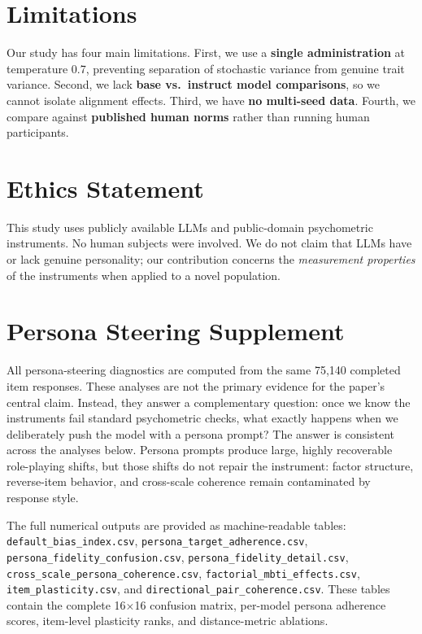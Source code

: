 \documentclass[11pt]{article}
\begin{document}
\section{Limitations}

Our study has four main limitations. First, we use a \textbf{single administration} at temperature 0.7, preventing separation of stochastic variance from genuine trait variance. Second, we lack \textbf{base vs.\ instruct model comparisons}, so we cannot isolate alignment effects. Third, we have \textbf{no multi-seed data}. Fourth, we compare against \textbf{published human norms} rather than running human participants.

\section*{Ethics Statement}

This study uses publicly available LLMs and public-domain psychometric instruments. No human subjects were involved. We do not claim that LLMs have or lack genuine personality; our contribution concerns the \emph{measurement properties} of the instruments when applied to a novel population.




\clearpage
\appendix

\section{Persona Steering Supplement}
\label{sec:appendix_persona_steering}

All persona-steering diagnostics are computed from the same 75{,}140 completed item responses. These analyses are not the primary evidence for the paper's central claim. Instead, they answer a complementary question: once we know the instruments fail standard psychometric checks, what exactly happens when we deliberately push the model with a persona prompt? The answer is consistent across the analyses below. Persona prompts produce large, highly recoverable role-playing shifts, but those shifts do not repair the instrument: factor structure, reverse-item behavior, and cross-scale coherence remain contaminated by response style.

The full numerical outputs are provided as machine-readable tables: \texttt{default\_bias\_index.csv}, \texttt{persona\_target\_adherence.csv}, \texttt{persona\_fidelity\_confusion.csv}, \texttt{persona\_fidelity\_detail.csv}, \texttt{cross\_scale\_persona\_coherence.csv}, \texttt{factorial\_mbti\_effects.csv}, \texttt{item\_plasticity.csv}, and \texttt{directional\_pair\_coherence.csv}. These tables contain the complete 16$\times$16 confusion matrix, per-model persona adherence scores, item-level plasticity ranks, and distance-metric ablations.
\end{document}
